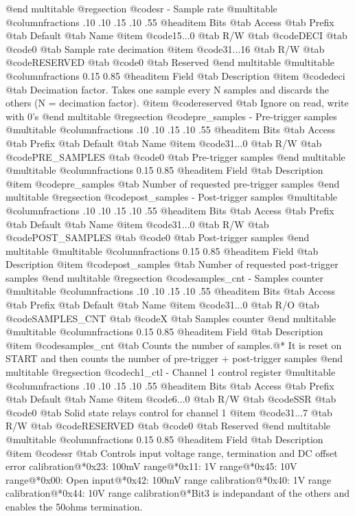 @end multitable
@regsection @code{sr} - Sample rate
@multitable @columnfractions .10 .10 .15 .10 .55
@headitem Bits @tab Access @tab Prefix @tab Default @tab Name
@item @code{15...0}
@tab R/W @tab
@code{DECI}
@tab @code{0} @tab 
Sample rate decimation
@item @code{31...16}
@tab R/W @tab
@code{RESERVED}
@tab @code{0} @tab 
Reserved
@end multitable
@multitable @columnfractions 0.15 0.85
@headitem Field @tab Description
@item @code{deci} @tab Decimation factor. Takes one sample every N samples and discards the others (N = decimation factor).
@item @code{reserved} @tab Ignore on read, write with 0's
@end multitable
@regsection @code{pre_samples} - Pre-trigger samples
@multitable @columnfractions .10 .10 .15 .10 .55
@headitem Bits @tab Access @tab Prefix @tab Default @tab Name
@item @code{31...0}
@tab R/W @tab
@code{PRE_SAMPLES}
@tab @code{0} @tab 
Pre-trigger samples
@end multitable
@multitable @columnfractions 0.15 0.85
@headitem Field @tab Description
@item @code{pre_samples} @tab Number of requested pre-trigger samples
@end multitable
@regsection @code{post_samples} - Post-trigger samples
@multitable @columnfractions .10 .10 .15 .10 .55
@headitem Bits @tab Access @tab Prefix @tab Default @tab Name
@item @code{31...0}
@tab R/W @tab
@code{POST_SAMPLES}
@tab @code{0} @tab 
Post-trigger samples
@end multitable
@multitable @columnfractions 0.15 0.85
@headitem Field @tab Description
@item @code{post_samples} @tab Number of requested post-trigger samples
@end multitable
@regsection @code{samples_cnt} - Samples counter
@multitable @columnfractions .10 .10 .15 .10 .55
@headitem Bits @tab Access @tab Prefix @tab Default @tab Name
@item @code{31...0}
@tab R/O @tab
@code{SAMPLES_CNT}
@tab @code{X} @tab 
Samples counter
@end multitable
@multitable @columnfractions 0.15 0.85
@headitem Field @tab Description
@item @code{samples_cnt} @tab Counts the number of samples.@* It is reset on START and then counts the number of pre-trigger + post-trigger samples
@end multitable
@regsection @code{ch1_ctl} - Channel 1 control register
@multitable @columnfractions .10 .10 .15 .10 .55
@headitem Bits @tab Access @tab Prefix @tab Default @tab Name
@item @code{6...0}
@tab R/W @tab
@code{SSR}
@tab @code{0} @tab 
Solid state relays control for channel 1
@item @code{31...7}
@tab R/W @tab
@code{RESERVED}
@tab @code{0} @tab 
Reserved
@end multitable
@multitable @columnfractions 0.15 0.85
@headitem Field @tab Description
@item @code{ssr} @tab Controls input voltage range, termination and DC offset error calibration@*0x23: 100mV range@*0x11: 1V range@*0x45: 10V range@*0x00: Open input@*0x42: 100mV range calibration@*0x40: 1V range calibration@*0x44: 10V range calibration@*Bit3 is indepandant of the others and enables the 50ohms termination.
